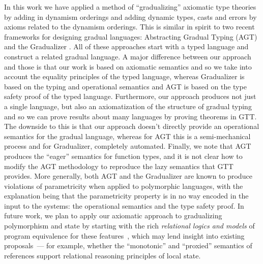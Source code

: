 \documentclass[acmsmall,nonacm]{acmart}
\newif\iflong
\begin{document}
{\iflong
\paragraph{Gradual Typing Frameworks}
\fi

In this work we have applied a method of ``gradualizing'' axiomatic
type theories by adding in dynamism orderings and adding dynamic
types, casts and errors by axioms related to the dynamism orderings.
%
This is similar in spirit to two recent frameworks for designing
gradual languages: Abstracting Gradual Typing (AGT) \citep{AGT} and the
Gradualizer \citep{gradualizer16,gradualizer17}.
%
All of these approaches start with a typed language and construct a
related gradual language.
%
A major difference between our approach and those is that our work is
based on axiomatic semantics and so we take into account the equality
principles of the typed language, whereas Gradualizer is based on the
typing and operational semantics and AGT is based on the type safety
proof of the typed language.
%
Furthermore, our approach produces not just a single language, but
also an axiomatization of the structure of gradual typing and so we
can prove results about many languages by proving theorems in GTT.
%
The downside to this is that our approach doesn't directly provide an
operational semantics for the gradual language, whereas for AGT this
is a semi-mechanical process and for Gradualizer, completely
automated.
%
Finally, we note that AGT produces the ``eager'' semantics for
function types, and it is not clear how to modify the AGT methodology
to reproduce the lazy semantics that GTT provides.
%
More generally, both AGT and the Gradualizer are known to produce
violations of parametricity when applied to polymorphic languages,
with the explanation being that the parametricity property is in no
way encoded in the input to the systems: the operational semantics and
the type safety proof.
%
In future work, we plan to apply our axiomatic approach to gradualizing
polymorphism and state by starting with the rich \emph{relational logics
  and models} of program equivalence for these
features~\cite{plotkinabadi93, dunphyphd, ahmed08:paramseal, neis09,
  ahmed09:sdri}, which may lend insight into existing
proposals~\cite{siek15:mono,ahmed17,igarashipoly17,siek-taha06}--- for
example, whether the ``monotonic'' \citep{siek15:mono} and ``proxied''
\citep{siek-taha06} semantics of references support relational reasoning
principles of local state.

}
\end{document}
